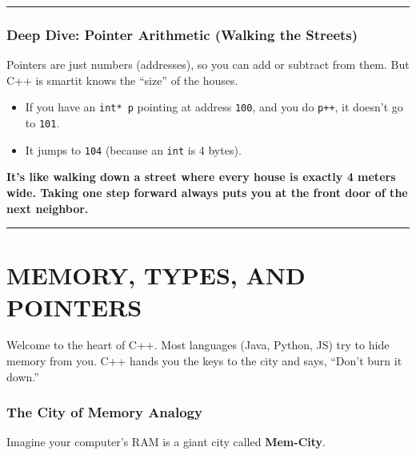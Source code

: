 \begin{center}\rule{0.5\linewidth}{0.5pt}\end{center}

\hypertarget{deep-dive-pointer-arithmetic-walking-the-streets}{%
\subsubsection{Deep Dive: Pointer Arithmetic (Walking the
Streets)}\label{deep-dive-pointer-arithmetic-walking-the-streets}}

Pointers are just numbers (addresses), so you can add or subtract from
them. But C++ is smartit knows the ``size'' of the houses.

\begin{itemize}
\tightlist
\item
  If you have an \passthrough{\lstinline!int* p!} pointing at address
  \passthrough{\lstinline!100!}, and you do
  \passthrough{\lstinline!p++!}, it doesn't go to
  \passthrough{\lstinline!101!}.
\item
  It jumps to \passthrough{\lstinline!104!} (because an
  \passthrough{\lstinline!int!} is 4 bytes).
\end{itemize}

\textbf{It's like walking down a street where every house is exactly 4
meters wide. Taking one step forward always puts you at the front door
of the next neighbor.}

\begin{center}\rule{0.5\linewidth}{0.5pt}\end{center}

\hypertarget{memory-types-and-pointers}{%
\section{MEMORY, TYPES, AND POINTERS}\label{memory-types-and-pointers}}

Welcome to the heart of C++. Most languages (Java, Python, JS) try to
hide memory from you. C++ hands you the keys to the city and says,
``Don't burn it down.''

\hypertarget{the-city-of-memory-analogy}{%
\subsubsection{The City of Memory
Analogy}\label{the-city-of-memory-analogy}}

Imagine your computer's RAM is a giant city called \textbf{Mem-City}.


